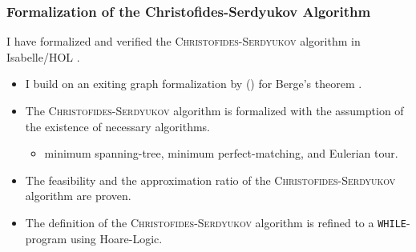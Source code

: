 \documentclass{beamer} %
\begin{document}
\begin{frame}
  \frametitle{Formalization of the Christofides-Serdyukov Algorithm}

  I have formalized and verified the \textsc{Christofides-Serdyukov} algorithm in Isabelle/HOL \parencite{nipkow_wenzel_paulson_2002}.

  \begin{itemize}
    \item I build on an exiting graph formalization by \citeauthor{abdulaziz_2020} (\citeyear{abdulaziz_2020}) for Berge's theorem \parencite{berge_1954}.
    \item The \textsc{Christofides-Serdyukov} algorithm is formalized with the assumption of the existence of necessary algorithms.
          \begin{itemize}
            \item minimum spanning-tree, minimum perfect-matching, and Eulerian tour.
          \end{itemize}
    \item The feasibility and the approximation ratio of the \textsc{Christofides-Serdyukov} algorithm are proven.
    \item The definition of the \textsc{Christofides-Serdyukov} algorithm is refined to a \texttt{WHILE}-program using Hoare-Logic.
  \end{itemize}
\end{frame}
\end{document}
